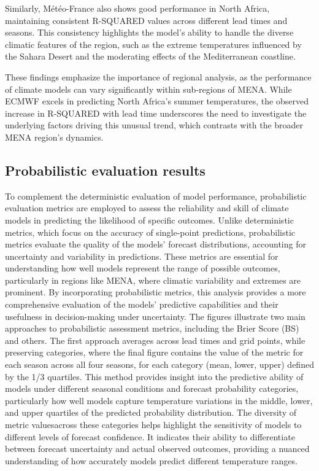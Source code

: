Similarly, Météo-France also shows good performance in North Africa, maintaining consistent R-SQUARED values across different lead times and seasons. This consistency highlights the model’s ability to handle the diverse climatic features of the region, such as the extreme temperatures influenced by the Sahara Desert and the moderating effects of the Mediterranean coastline.

These findings emphasize the importance of regional analysis, as the performance of climate models can vary significantly within sub-regions of MENA. While ECMWF excels in predicting North Africa’s summer temperatures, the observed increase in R-SQUARED with lead time underscores the need to investigate the underlying factors driving this unusual trend, which contrasts with the broader MENA region's dynamics.




\subsection{Probabilistic evaluation results}

To complement the deterministic evaluation of model performance, probabilistic evaluation metrics are employed to assess the reliability and skill of climate models in predicting the likelihood of specific outcomes. Unlike deterministic metrics, which focus on the accuracy of single-point predictions, probabilistic metrics evaluate the quality of the models’ forecast distributions, accounting for uncertainty and variability in predictions. These metrics are essential for understanding how well models represent the range of possible outcomes, particularly in regions like MENA, where climatic variability and extremes are prominent. By incorporating probabilistic metrics, this analysis provides a more comprehensive evaluation of the models’ predictive capabilities and their usefulness in decision-making under uncertainty.
The figures illustrate two main approaches to probabilistic assessment metrics, including the Brier Score (BS) and others. The first approach averages across lead times and grid points, while preserving categories, where the final figure contains the value of the metric for each season across all four seasons, for each category (mean, lower, upper) defined by the 1/3 quartiles. This method provides insight into the predictive ability of models under different seasonal conditions and forecast probability categories, particularly how well models capture temperature variations in the middle, lower, and upper quartiles of the predicted probability distribution. The diversity of metric values ​​across these categories helps highlight the sensitivity of models to different levels of forecast confidence. It indicates their ability to differentiate between forecast uncertainty and actual observed outcomes, providing a nuanced understanding of how accurately models predict different temperature ranges.

